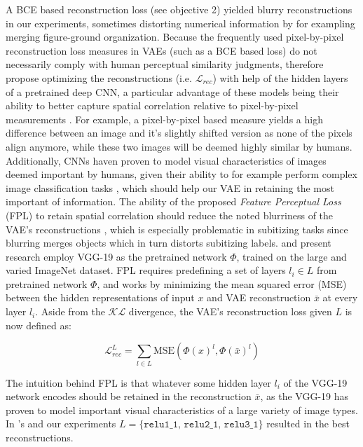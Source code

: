 \documentclass[twocolumn]{article}
\begin{document}
A BCE based reconstruction loss (see objective 2) yielded blurry reconstructions in our experiments, sometimes distorting numerical information by for exampling merging figure-ground organization.
Because the frequently used pixel-by-pixel reconstruction loss measures
in VAEs (such as a BCE based loss) do not necessarily comply with human perceptual similarity
judgments, \citet{hou2017deep} therefore propose optimizing the reconstructions (i.e. \(\mathcal{L}_{rec}\)) with help of the hidden layers of a pretrained deep CNN, a particular advantage of these models being their ability to better capture spatial correlation relative to pixel-by-pixel measurements \citep{hou2017deep}. For example, a pixel-by-pixel based measure yields a high difference between an image and it's slightly shifted version as none of the pixels align anymore, while these two images will be deemed highly similar by humans.
Additionally, CNNs haven proven to model visual characteristics of
images deemed important by humans, given their ability to for example perform
complex image classification tasks \citep{krizhevsky2012imagenet}, which should help our VAE in retaining the most important of information.  The ability
of the proposed \emph{Feature Perceptual Loss} (FPL) to retain spatial
correlation should reduce the noted blurriness
\citep[see for example]{larsen2015autoencoding} of the VAE's reconstructions \citep{hou2017deep}, which is
especially problematic in subitizing tasks since blurring merges objects
which in turn distorts subitizing labels. \citet{hou2017deep} and
present research employ VGG-19 \citep{simonyan2014very} as the
pretrained network \(\Phi\), trained on the large and varied ImageNet
\citep{russakovsky2015imagenet} dataset. FPL requires predefining a set
of layers \(l_i \in L\) from pretrained network \(\Phi\), and works by
minimizing the mean squared error (MSE) between the hidden
representations of input \(x\) and VAE reconstruction \(\bar{x}\) at
every layer \(l_i\). Aside from the \(\mathcal{KL}\) divergence, the
VAE's reconstruction loss given $L$ is now defined as:

\[ \mathcal{L}^{L}_{rec} = \sum_{l \in L}^{} \textrm{MSE}(\Phi(x)^{l}, \Phi(\bar{x})^{l})\]

\noindent The intuition behind FPL is that whatever some hidden layer \(l_i\) of
the VGG-19 network encodes should be retained in the reconstruction
\(\bar{x}\), as the VGG-19 has proven to model important visual
characteristics of a large variety of image types. In
\citet{hou2017deep}'s and our experiments
\(L = \{\texttt{relu1\_1, relu2\_1, relu3\_1\}}\) resulted in the best
reconstructions. 
\end{document}
